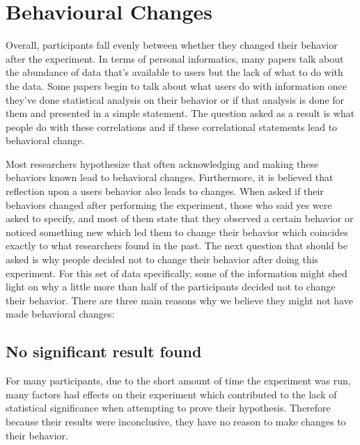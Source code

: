 \section{Behavioural Changes}
Overall, participants fall evenly between whether they changed their behavior after the experiment. In terms of personal informatics, many papers talk about the abundance of data that’s available to users but the lack of what to do with the data. Some papers begin to talk about what users do with information once they’ve done statistical analysis on their behavior or if that analysis is done for them and presented in a simple statement. The question asked as a result is what people do with these correlations and if these correlational statements lead to behavioral change. 


    Most researchers hypothesize that often acknowledging and making these behaviors known lead to behavioral changes. Furthermore, it is believed that reflection upon a user\textquotesingle s behavior also leads to changes. When asked if their behaviors changed after performing the experiment, those who said yes were asked to specify, and most of them state that they observed a certain behavior or noticed something new which led them to change their behavior which coincides exactly to what researchers found in the past. 
    The next question that should be asked is why people decided not to change their behavior after doing this experiment. For this set of data specifically, some of the information might shed light on why a little more than half of the participants decided not to change their behavior. There are three main reasons why we believe they might not have made behavioral changes:
    \subsection{No significant result found}
    For many participants, due to the short amount of time the experiment was run, many factors had effects on their experiment which contributed to the lack of statistical significance when attempting to prove their hypothesis. Therefore because their results were inconclusive, they have no reason to make changes to their behavior.
